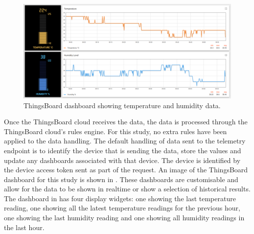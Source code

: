 \begin{figure}[H]
    \centering
    \includegraphics[width=\imageWidth\textwidth]{assets/thingsboard_dashboard.png}
    \caption{\label{fig:thingsboard_dashboard} ThingsBoard dashboard showing temperature and humidity data.}
\end{figure}

Once the ThingsBoard cloud receives the data, the data is processed through the
ThingsBoard cloud's rules engine. For this study, no extra rules have been 
applied to the data handling. The default handling of data sent to the telemetry
endpoint is to identify the device that is sending the data, store the values
and update any dashboards associated with that device. The device is 
identified by the device access token sent as part of the request. An image 
of the ThingsBoard dashboard for this study is shown in 
. These dashboards are customisable and allow
for the data to be shown in realtime or show a selection of historical results.
The dashboard in  has four display widgets:
one showing the last temperature reading, one showing all the latest temperature
readings for the previous hour, one showing the last humidity reading and one
showing all humidity readings in the last hour.
